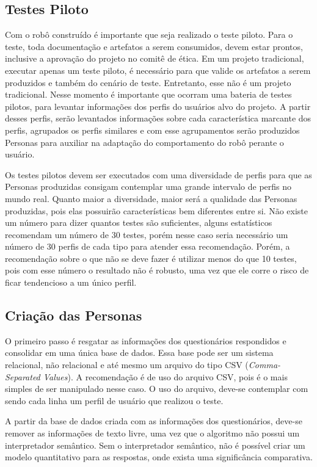 \subsection{Testes Piloto}
\label{sec:testepiloto}
Com o robô construído é importante que seja realizado o teste piloto. Para o teste, toda documentação e artefatos a serem consumidos, devem estar prontos, inclusive a aprovação do projeto no comitê de ética. Em um projeto tradicional, executar apenas um teste piloto, é necessário para que valide os artefatos a serem produzidos e também do cenário de teste. Entretanto, esse não é um projeto tradicional. Nesse momento é importante que ocorram uma bateria de testes pilotos, para levantar informações dos perfis do usuários alvo do projeto. A partir desses perfis, serão levantados informações sobre cada característica marcante dos perfis, agrupados os perfis similares e com esse agrupamentos serão produzidos Personas para auxiliar na adaptação do comportamento do robô perante o usuário.

Os testes pilotos devem ser executados com uma diversidade de perfis para que as Personas produzidas consigam contemplar uma grande intervalo de perfis no mundo real. Quanto maior a diversidade, maior será a qualidade das Personas produzidas, pois elas possuirão características bem diferentes entre si. Não existe um número para dizer quantos testes são suficientes, alguns estatísticos recomendam um número de 30 testes, porém nesse caso seria necessário um número de 30 perfis de cada tipo para atender essa recomendação. Porém, a recomendação sobre o que não se deve fazer é utilizar menos do que 10 testes, pois com esse número o resultado não é robusto, uma vez que ele corre o risco de ficar tendencioso a um único perfil.

\subsection{Criação das Personas}
\label{sec:criacaopersonas}
O primeiro passo é resgatar as informações dos questionários respondidos e consolidar em uma única base de dados. Essa base pode ser um sistema relacional, não relacional e até mesmo um arquivo do tipo CSV (\textit{Comma-Separated Values}). A recomendação é de uso do arquivo CSV, pois é o mais simples de ser manipulado nesse caso. O uso do arquivo, deve-se contemplar com sendo cada linha um perfil de usuário que realizou o teste.

A partir da base de dados criada com as informações dos questionários, deve-se remover as informações de texto livre, uma vez que o algoritmo não possui um interpretador semântico. Sem o interpretador semântico, não é possível criar um modelo quantitativo para as respostas, onde exista uma significância comparativa.

